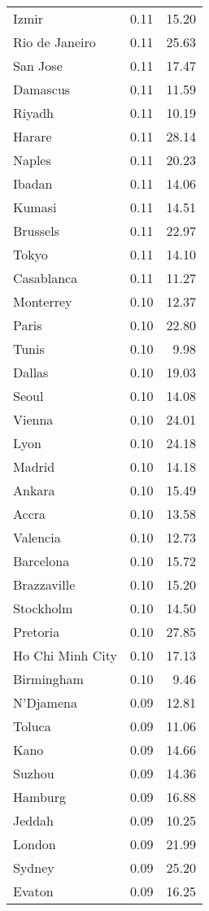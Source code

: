 \begin{longtable}{lrr}
  Izmir & 0.11 & 15.20 \\ 
  Rio de Janeiro & 0.11 & 25.63 \\ 
  San Jose & 0.11 & 17.47 \\ 
  Damascus & 0.11 & 11.59 \\ 
  Riyadh & 0.11 & 10.19 \\ 
  Harare & 0.11 & 28.14 \\ 
  Naples & 0.11 & 20.23 \\ 
  Ibadan & 0.11 & 14.06 \\ 
  Kumasi & 0.11 & 14.51 \\ 
  Brussels & 0.11 & 22.97 \\ 
  Tokyo & 0.11 & 14.10 \\ 
  Casablanca & 0.11 & 11.27 \\ 
  Monterrey & 0.10 & 12.37 \\ 
  Paris & 0.10 & 22.80 \\ 
  Tunis & 0.10 & 9.98 \\ 
  Dallas & 0.10 & 19.03 \\ 
  Seoul & 0.10 & 14.08 \\ 
  Vienna & 0.10 & 24.01 \\ 
  Lyon & 0.10 & 24.18 \\ 
  Madrid & 0.10 & 14.18 \\ 
  Ankara & 0.10 & 15.49 \\ 
  Accra & 0.10 & 13.58 \\ 
  Valencia & 0.10 & 12.73 \\ 
  Barcelona & 0.10 & 15.72 \\ 
  Brazzaville & 0.10 & 15.20 \\ 
  Stockholm & 0.10 & 14.50 \\ 
  Pretoria & 0.10 & 27.85 \\ 
  Ho Chi Minh City & 0.10 & 17.13 \\ 
  Birmingham & 0.10 & 9.46 \\ 
  N'Djamena & 0.09 & 12.81 \\ 
  Toluca & 0.09 & 11.06 \\ 
  Kano & 0.09 & 14.66 \\ 
  Suzhou & 0.09 & 14.36 \\ 
  Hamburg & 0.09 & 16.88 \\ 
  Jeddah & 0.09 & 10.25 \\ 
  London & 0.09 & 21.99 \\ 
  Sydney & 0.09 & 25.20 \\ 
  Evaton & 0.09 & 16.25 \\ 

\end{longtable}
